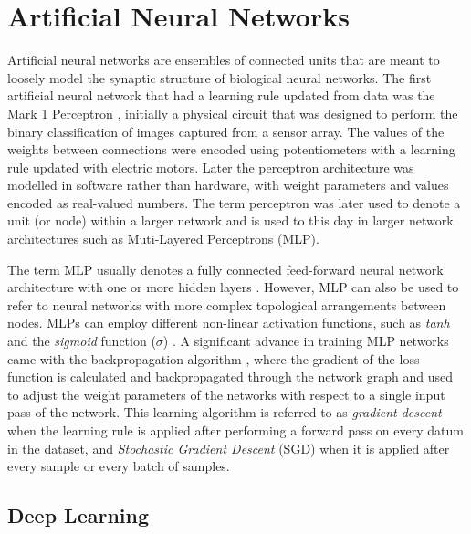 \section{Artificial Neural Networks}
\label{c2:subsec:neural-networks}

Artificial neural networks are ensembles of connected units that are meant to loosely model the synaptic structure of biological neural networks. 
The first artificial neural network that had a learning rule updated from data was the Mark 1 Perceptron \citep{rosenblatt1958perceptron}, initially a physical circuit that was designed to perform the binary classification of images captured from a sensor array. 
The values of the weights between connections were encoded using potentiometers with a learning rule updated with electric motors. 
Later the perceptron architecture was modelled in software rather than hardware, with weight parameters and values encoded as real-valued numbers. 
The term perceptron was later used to denote a unit (or node) within a larger network and is used to this day in larger network architectures such as Muti-Layered Perceptrons (MLP).

The term MLP usually denotes a fully connected feed-forward neural network architecture with one or more hidden layers \citep{rosenblatt1958perceptron}. 
However, MLP can also be used to refer to neural networks with more complex topological arrangements between nodes. 
MLPs can employ different non-linear activation functions, such as \textit{tanh} \citep{kalman1992tanh} and the \textit{sigmoid} function ($\sigma$) \citep{han1995influence}.
A significant advance in training MLP networks came with the backpropagation algorithm \citep{werbos1974beyond}, where the gradient of the loss function is calculated and backpropagated through the network graph and used to adjust the weight parameters of the networks with respect to a single input pass of the network. 
This learning algorithm is referred to as \textit{gradient descent} when the learning rule is applied after performing a forward pass on every datum in the dataset, and \textit{Stochastic Gradient Descent} (SGD) when it is applied after every sample or every batch of samples. 

\subsection{Deep Learning}

